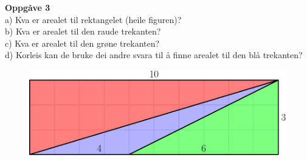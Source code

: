 \textbf{Oppgåve 3}\\
a) Kva er arealet til rektangelet (heile figuren)?\\
b) Kva er arealet til den raude trekanten?\\
c) Kva er arealet til den grøne trekanten?\\
d) Korleis kan de bruke dei andre svara til å finne arealet til den blå trekanten?
\begin{figure}
	\centering
	\includegraphics[]{artrknt3}
\end{figure}
